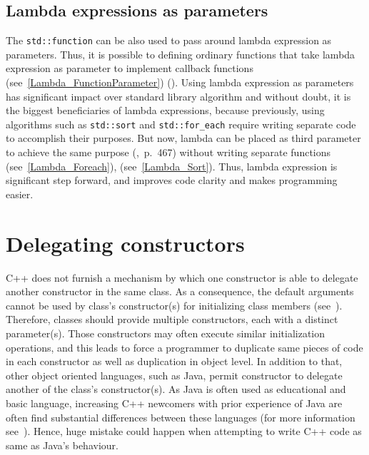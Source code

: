 \documentclass[11pt]{report}
\begin{document}
\subsection{Lambda expressions as parameters}
\label{subsection: Lambda Expressions as Parameters}
The \texttt{std::function} can be also used to pass around lambda expression as parameters. Thus, it is possible to defining ordinary functions that take lambda expression as parameter to implement callback functions (see~\ref{Lambda_FunctionParameter}) (\cite{Allain:2011:FutureCpp}). Using lambda expression as parameters has significant impact over standard library algorithm and without doubt, it is the biggest beneficiaries of lambda expressions, because previously, using algorithms such as \texttt{std::sort} and \linebreak \texttt{std::for\_each} require writing separate code to accomplish their purposes. But now, lambda can be placed as third parameter to achieve the same purpose (\cite{Gregorie:professionalcpp},~p.~467) without writing separate functions (see~\ref{Lambda_Foreach}), (see~\ref{Lambda_Sort}). Thus, lambda expression is significant step forward, and improves code clarity and makes programming easier.

\section{Delegating constructors}
\label{section: Delegating constructors}
C++ does not furnish a mechanism by which one constructor is able to delegate another constructor in the same class.  As a consequence, the default arguments cannot be used by class's constructor(s) for initializing class members (see~\cite{Stroustrup:2012:Cpp11}). Therefore, classes should provide multiple constructors, each with a distinct parameter(s). Those constructors may often execute similar initialization operations, and this leads to force a programmer to duplicate same pieces of code in each constructor as well as duplication in object level. In addition to that, other object oriented languages, such as Java, permit constructor to delegate another of the class's constructor(s). As Java is often used as educational and basic language, increasing C++ newcomers with prior experience of Java are often find substantial differences between these languages (for more information see~\cite{Stroustrup:2012:Cpp11}). Hence, huge mistake could happen when attempting to write C++ code as same as Java's behaviour.
\end{document}
